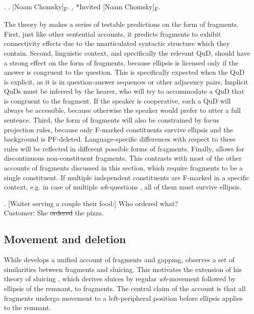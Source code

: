 \ex. \a. [Noam Chomsky]\textsubscript{F}.
     \b. *Invited [Noam Chomsky]\textsubscript{F}.

The theory by \citet{reich2007} makes a series of testable predictions on the form of fragments. First, just like other sentential accounts, it predicts fragments to exhibit connectivity effects due to the unarticulated syntactic structure which they contain. Second, linguistic context, and specifically the relevant QuD, should have a strong effect on the form of fragments, because ellipsis is licensed only if the answer is congruent to the question. This is specifically expected when the QuD is explicit, as it is in question-answer sequences or other adjacency pairs. Implicit QuDs must be inferred by the hearer, who will try to accommodate a QuD that is congruent to the fragment. If the speaker is cooperative, such a QuD will always be accessible, because otherwise the speaker would prefer to utter a full sentence. Third, the form of fragments will also be constrained by focus projection rules, because only F-marked constituents survive ellipsis and the background is PF-deleted. Language-specific differences with respect to these rules will be reflected in different possible forms of fragments. Finally, \citet{reich2007} allows for discontinuous non-constituent fragments. This contrasts with most of the other accounts of fragments discussed in this section, which require fragments to be a single constituent. If multiple independent constituents are F-marked in a specific context, e.g. in case of multiple \textit{wh}-questions \Next, all of them must survive ellipsis.

\ex. [Waiter serving a couple their food:] Who ordered what?\\
Customer: She \sout{ordered} the pizza. \label{ex:theories-discontinuous-en-pizza}


\subsection{Movement and deletion} \label{sec:theories-movement}

While \citet{reich2007} develops a unified account of fragments and gapping, \citet{merchant2004} observes a set of similarities between fragments and sluicing. This motivates the extension of his theory of sluicing \citep{merchant2001}, which derives sluices by regular \textit{wh}-movement followed by ellipsis of the remnant, to fragments. The central claim of the account is that all fragments undergo movement to a left-peripheral position before ellipsis applies to the remnant.

